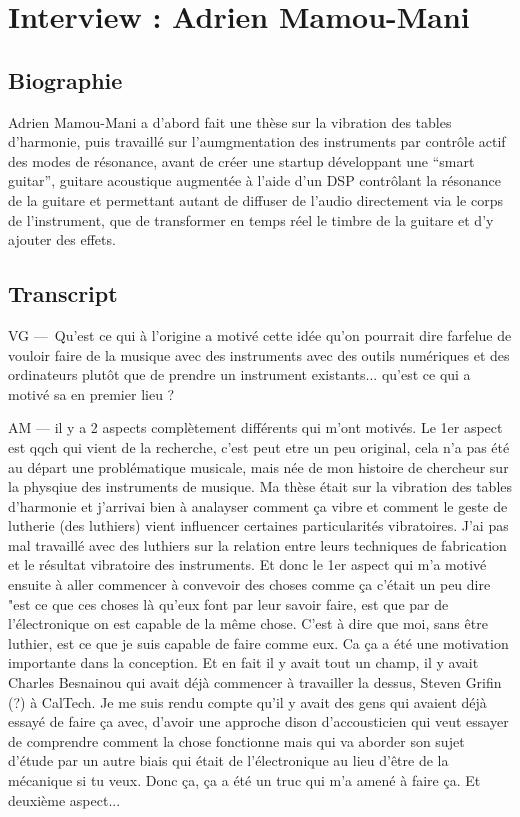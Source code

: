 \chapter{Interview : Adrien Mamou-Mani}
\label{appendix:mamou-mani}

\section*{Biographie}

Adrien Mamou-Mani a d'abord fait une thèse sur la vibration des tables d'harmonie, puis travaillé sur l'aumgmentation des instruments par contrôle actif des modes de résonance, avant de créer une startup développant une ``smart guitar'', guitare acoustique augmentée à l'aide d'un DSP contrôlant la résonance de la guitare et permettant autant de diffuser de l'audio directement via le corps de l'instrument, que de transformer en temps réel le timbre de la guitare et d'y ajouter des effets.

\section*{Transcript}

VG — Qu'est ce qui à l'origine a motivé cette idée qu'on pourrait dire farfelue de vouloir faire de la musique avec des instruments avec des outils numériques et des ordinateurs plutôt que de prendre un instrument existants... qu'est ce qui a motivé sa en premier lieu ?


AM — il y a 2 aspects complètement différents qui m'ont motivés. Le 1er aspect est qqch qui vient de la recherche, c'est peut etre un peu original, cela n'a pas été au départ une problématique musicale, mais née de mon histoire de chercheur sur la physqiue des instruments de musique. Ma thèse était sur la vibration des tables d'harmonie et j'arrivai bien à analayser comment ça vibre et comment le geste de lutherie (des luthiers) vient influencer certaines particularités vibratoires. J'ai pas mal travaillé avec des luthiers sur la relation entre leurs techniques de fabrication et le résultat vibratoire des instruments.
Et donc le 1er aspect qui m'a motivé ensuite à aller commencer à convevoir des choses comme ça c'était un peu dire "est ce que ces choses là qu'eux font par leur savoir faire, est que par de l'électronique on est capable de la même chose. C'est à dire que moi, sans être luthier, est ce que je suis capable de faire comme eux. Ca ça a été une motivation importante dans la conception. Et en fait il y avait tout un champ, il y avait Charles Besnainou qui avait déjà commencer à travailler la dessus, Steven Grifin (?) à CalTech. 
Je me suis rendu compte qu'il y avait des gens qui avaient déjà essayé de faire ça avec, d'avoir une approche dison d'accousticien qui veut essayer de comprendre comment la chose fonctionne mais qui va aborder son sujet d'étude par un autre biais qui était de l'électronique au lieu d'être de la mécanique si tu veux. 
Donc ça, ça a été un truc qui m'a amené à faire ça. Et deuxième aspect... 

